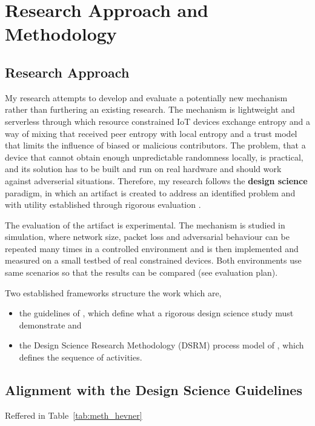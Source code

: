 \documentclass[a4paper, 12pt]{article}
\begin{document}
\section{Research Approach and Methodology}
\subsection{Research Approach}
 
My research attempts to develop and evaluate a potentially new mechanism rather than furthering an existing research. The mechanism is lightweight and serverless through which resource constrained IoT devices exchange entropy and a way of mixing that received peer entropy with local entropy and a trust model that limits the influence of biased or malicious contributors. The problem, that a device that cannot obtain enough unpredictable randomness locally, is practical, and its solution has to be built and run on real hardware and should work against adverserial situations. Therefore, my research follows the \textbf{design science} paradigm, in which an artifact is created to address an identified problem and with utility established through rigorous evaluation \citep{hevner2004design}.
 
The evaluation of the artifact is experimental. The mechanism is studied in simulation, where network size, packet loss and adversarial behaviour can be repeated many times in a controlled environment and is then implemented and measured on a small testbed of real constrained devices. Both environments use same scenarios so that the results can be compared (see evaluation plan).
 
Two established frameworks structure the work which are,
\begin{itemize}
    \item the guidelines of \citet{hevner2004design}, which define what a rigorous design science study must demonstrate and
    \item the Design Science Research Methodology (DSRM) process model of \citet{peffers2007dsrm}, which defines the sequence of activities.
\end{itemize}
  
\subsection{Alignment with the Design Science Guidelines}
 
Reffered in Table~\ref{tab:meth_hevner}
 
\end{document}
